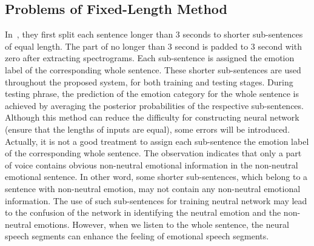 \documentclass[a4paper]{article}
\begin{document}
\subsection{Problems of Fixed-Length Method}
\label{ssec:problem_fixed_len}

In~\cite{satt2017}, they first split each sentence longer than 3 seconds to shorter sub-sentences of equal length. The part of no longer than 3 second is padded to 3 second with zero after extracting spectrograms. Each sub-sentence is assigned the emotion label of the corresponding whole sentence. These shorter sub-sentences are used throughout the proposed system, for both training and testing stages. During testing phrase, the prediction of the emotion category for the whole sentence is achieved by averaging the posterior probabilities of the respective sub-sentences. Although this method can reduce the difficulty for constructing neural network (ensure that the lengths of inputs are equal), some errors will be introduced. Actually, it is not a good treatment to assign each sub-sentence the emotion label of the corresponding whole sentence. The observation indicates that only a part of voice contains obvious non-neutral emotional information in the non-neutral emotional sentence. In other word, some shorter sub-sentences, which belong to a sentence with non-neutral emotion, may not contain any non-neutral emotional information. The use of such sub-sentences for training neutral network may lead to the confusion of the network in identifying the neutral emotion and the non-neutral emotions. However, when we listen to the whole sentence, the neural speech segments can enhance the feeling of emotional speech segments.


\end{document}
